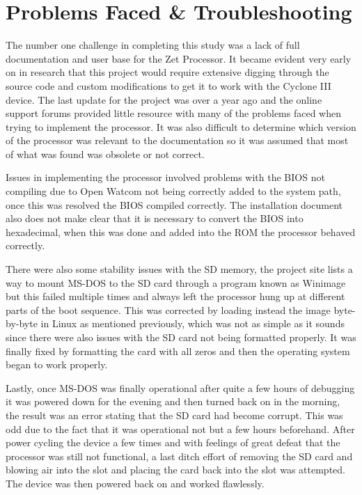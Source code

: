 \documentclass[pdftex,10.5pt]{report}
\begin{document}
\newpage
\section{Problems Faced \& Troubleshooting}
The number one challenge in completing this study was a lack of full documentation and user base for the Zet Processor. It became evident very early on in research that this project would require extensive digging through the source code and custom modifications to get it to work with the Cyclone III device. The last update for the project was over a year ago and the online support forums provided little resource with many of the problems faced when trying to implement the processor. It was also difficult to determine which version of the processor was relevant to the documentation so it was assumed that most of what was found was obsolete or not correct.

Issues in implementing the processor involved problems with the BIOS not compiling due to Open Watcom not being correctly added to the system path, once this was resolved the BIOS compiled correctly. The installation document also does not make clear that it is necessary to convert the BIOS into hexadecimal, when this was done and added into the ROM the processor behaved correctly. 

There were also some stability issues with the SD memory, the project site lists a way to mount MS-DOS to the SD card through a program known as Winimage but this failed multiple times and always left the processor hung up at different parts of the boot sequence. This was corrected by loading instead the image byte-by-byte in Linux as mentioned previously, which was not as simple as it sounds since there were also issues with the SD card not being formatted properly. It was finally fixed by formatting the card with all zeros and then the operating system began to work properly.

Lastly, once MS-DOS was finally operational after quite a few hours of debugging it was powered down for the evening and then turned back on in the morning, the result was an error stating that the SD card had become corrupt. This was odd due to the fact that it was operational not but a few hours beforehand. After power cycling the device a few times and with feelings of great defeat that the processor was still not functional, a last ditch effort of removing the SD card and blowing air into the slot and placing the card back into the slot was attempted. The device was then powered back on and worked flawlessly.
\end{document}

